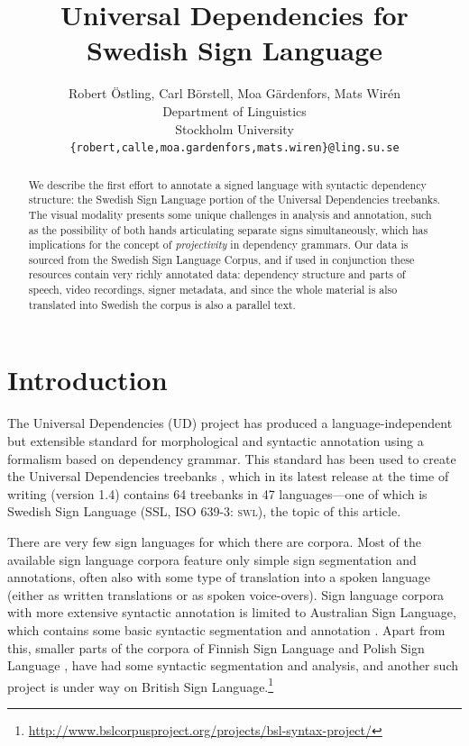 \documentclass[11pt]{article}
\title{Universal Dependencies for Swedish Sign Language}
\author{Robert {\"O}stling, Carl B{\"o}rstell,
    Moa G{\"a}rdenfors, Mats Wir{\'e}n \\
  Department of Linguistics \\
  Stockholm University \\
  {\tt \{robert,calle,moa.gardenfors,mats.wiren\}@ling.su.se} \\}
\date{}
\begin{document}
\maketitle
\begin{abstract}
    We describe the first effort to annotate a signed language with syntactic
    dependency structure: the Swedish Sign Language portion of the
    Universal Dependencies treebanks.
    The visual modality presents some unique challenges in analysis and
    annotation, such as the possibility of
    both hands articulating separate signs simultaneously, which has
    implications for the concept of \emph{projectivity} in dependency grammars.
    Our data is sourced from the Swedish Sign Language Corpus,
    and if used in conjunction these resources contain very richly
    annotated data: dependency structure and parts of speech,
    video recordings, signer metadata, and since the whole material is
    also translated into Swedish the corpus is also a parallel text.
\end{abstract}

\section{Introduction}

The Universal Dependencies (UD) project \cite{Nivre2016ud} 
has produced a language-independent but extensible standard for
morphological and syntactic annotation using a formalism based on
dependency grammar. This standard has been used to create the Universal
Dependencies treebanks \cite{ud14}, which in its latest release at the time of
writing (version 1.4) contains 64 treebanks in 47 languages---one of which is
Swedish Sign Language (SSL, ISO 639-3: \textsc{swl}), the topic of this
article.

There are very few sign languages for which there are corpora. Most of the
available sign language corpora feature only simple sign segmentation and
annotations, often also with some type of translation into a spoken language
(either as written translations or as spoken voice-overs). Sign language
corpora with more extensive syntactic annotation is limited to Australian Sign
Language, which contains some basic syntactic segmentation and annotation
\cite{Johnston2014annotation}. Apart from this, smaller parts of the corpora
of Finnish Sign Language \cite{Jantunen2016corpus} and Polish Sign Language
\cite{Rutkowski2016corpus}, have had some syntactic segmentation and analysis,
and another such project is under way on British Sign
Language.\footnote{\url{http://www.bslcorpusproject.org/projects/bsl-syntax-project/}}
\end{document}
